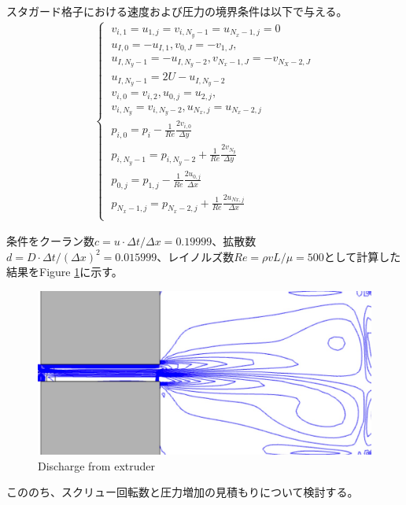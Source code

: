 \documentclass[twocolumn,oneside,a4paper]{article}
\begin{document}
スタガード格子における速度および圧力の境界条件は以下で与える。
\begin{eqnarray}\label{eq:vcondition}
\begin{cases}
\;v_{i,1} = u_{1,j} = v_{i,N_y-1} = u_{N_x-1,j} = 0\nonumber\\
\;u_{I,0} = -u_{I,1}, v_{0,J} = -v_{1,J}, \nonumber\\
\; u_{I,N_y-1} = -u_{I,N_y-2}, v_{N_x-1,J} = -v_{N_X-2,J} \nonumber\\
\; u_{I,N_y-1} = 2U - u_{I,N_y-2} \nonumber\\
\; v_{i,0} = v_{i,2}, u_{0,j} = u_{2,j}, \nonumber\\
\; v_{i,N_y} = v_{i,N_y-2}, u_{N_x,j} = u_{N_x-2,j} \\
\;p_{i,0} = p_i - \frac{1}{Re}\frac{2v_{i,0}}{\Delta y} \nonumber\\
\;p_{i,N_y-1} = p_{i,N_y-2} + \frac{1}{Re}\frac{2v_{N_y}}{\Delta y} \nonumber\\
\;p_{0,j} = p_{1,j} - \frac{1}{Re}\frac{2u_{0,j}}{\Delta x} \nonumber\\
\;p_{N_x-1,j} = p_{N_x-2,j} + \frac{1}{Re}\frac{2u_{Nx,j}}{\Delta x}  \\
\end{cases}  
\end{eqnarray}



条件をクーラン数$c=u \cdot \Delta t / \Delta x=0.19999$、拡散数$d=D \cdot \Delta t/(\Delta x)^2=0.015999$、レイノルズ数$Re=\rho v L / \mu = 500$として計算した結果をFigure \ref{eq:duct_fs}に示す。

\begin{figure}[htbp]
        \includegraphics[bb=0 0 619 304,width=1\columnwidth]{duct_fs.pdf}
    \caption{Discharge from extruder}
   \label{eq:duct_fs}
\end{figure}

こののち、スクリュー回転数と圧力増加の見積もりについて検討する。
\end{document}
